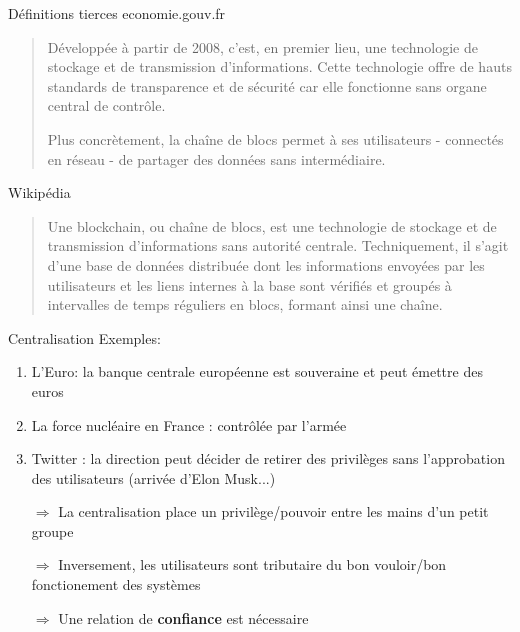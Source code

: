 \begin{frame}{Définitions tierces}
  economie.gouv.fr
  \begin{quote}
    Développée à partir de 2008, c'est, en premier lieu, une technologie de stockage et de transmission d’informations. Cette technologie offre de hauts standards de transparence et de sécurité car elle fonctionne sans organe central de contrôle.

    Plus concrètement, la chaîne de blocs permet à ses utilisateurs - connectés en réseau - de partager des données sans intermédiaire.
  \end{quote}


  Wikipédia
  \begin{quote}
    Une blockchain, ou chaîne de blocs, est une technologie de stockage et de transmission d'informations sans autorité centrale. Techniquement, il s'agit d'une base de données distribuée dont les informations envoyées par les utilisateurs et les liens internes à la base sont vérifiés et groupés à intervalles de temps réguliers en blocs, formant ainsi une chaîne.
  \end{quote}
\end{frame}

\begin{frame}{Centralisation}
  Exemples:

  \begin{enumerate}
    \item L'Euro: la banque centrale européenne est souveraine et peut émettre des euros
    \item La force nucléaire en France : contrôlée par l'armée
    \item Twitter : la direction peut décider de retirer des privilèges sans l'approbation des utilisateurs (arrivée d'Elon Musk...)
  \end{enumerate}

  \begin{itemize}
    \item[$\Rightarrow$] La centralisation place un privilège/pouvoir entre les mains d'un petit groupe
    \item[$\Rightarrow$] Inversement, les utilisateurs sont tributaire du bon vouloir/bon fonctionement des systèmes
    \item[$\Rightarrow$] Une relation de \textbf{confiance} est nécessaire
  \end{itemize}
\end{frame}